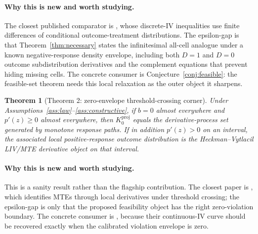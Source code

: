 \documentclass[11pt]{article}
\theoremstyle{definition}
\theoremstyle{plain}
\newtheorem{theorem}{Theorem}
\theoremstyle{remark}
\begin{document}
\paragraph{Why this is new and worth studying.}
The closest published comparator is \citet{Kitagawa2015}, whose discrete-IV inequalities use finite differences of conditional outcome-treatment distributions.  The epsilon-gap is that Theorem~\ref{thm:necessary} states the infinitesimal all-cell analogue under a known negative-response density envelope, including both \(D=1\) and \(D=0\) outcome subdistribution derivatives and the complement equations that prevent hiding missing cells.  The concrete consumer is Conjecture~\ref{conj:feasible}: the feasible-set theorem needs this local relaxation as the outer object it sharpens.

\begin{theorem}[Theorem 2: zero-envelope threshold-crossing corner]\label{thm:zero}
Under Assumptions~\ref{ass:law}--\ref{ass:constructive}, if \(b=0\) almost everywhere and \(p'(z)\ge0\) almost everywhere, then \(K_0^{\mathrm{proj}}\) equals the derivative-process set generated by monotone response paths.  If in addition \(p'(z)>0\) on an interval, the associated local positive-response outcome distribution is the Heckman--Vytlacil LIV/MTE derivative object on that interval.
\end{theorem}
\paragraph{Why this is new and worth studying.}
This is a sanity result rather than the flagship contribution.  The closest paper is \citet{HeckmanVytlacil2005}, which identifies MTEs through local derivatives under threshold crossing; the epsilon-gap is only that the proposed feasibility object has the right zero-violation boundary.  The concrete consumer is \citet{KennedyLorchSmall2019}, because their continuous-IV curve should be recovered exactly when the calibrated violation envelope is zero.
\end{document}
